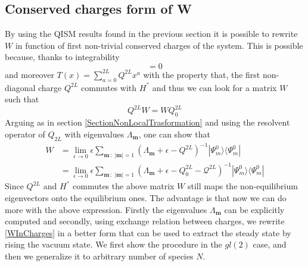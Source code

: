 \documentclass[10pt]{article}
\numberwithin{equation}{section}
\numberwithin{equation}{subsection}
\begin{document}
\subsection{Conserved charges form of W}
By using the QISM results found in the previous section it is possible to rewrite $W$ in function of first non-trivial conserved charges of the system. This is possible because, thanks to integrability
\begin{equation}
	[H^{''},T(x)]=0
\end{equation}
and moreover $T(x)=\sum_{a=0}^{2L}Q^{2L}x^{a}$ with the property that, the first non-diagonal charge $Q^{2L}$ commutes with $H^{''}$ and thus we can look for a matrix $W$ such that 
\begin{equation}
	Q^{2L}W=WQ_{0}^{2L}
\end{equation}
Arguing as in section \ref{SectionNonLocalTrasformation} and using the resolvent operator of $Q_{2L}$ with eigenvalues $\Lambda_{\bm{m}}$, one can show that 
\begin{equation}\label{WInCharges}
	\begin{split}
	W&=\lim_{\epsilon\to 0}\epsilon\sum_{\bm{m}\,:\;|\bm{m}|=1}\left(\Lambda_{\bm{m}}+\epsilon-Q^{2L}\right)^{-1}|\Psi_{m}^{0}\rangle\langle \Psi_{m}^{0}|\\&=\lim_{\epsilon\to 0}\epsilon\sum_{\bm{m}\,:\;|\bm{m}|=1}\left(\Lambda_{\bm{m}}+\epsilon-Q^{2L}_{0}-\mathcal{Q}^{2L}\right)^{-1}|\Psi_{m}^{0}\rangle\langle \Psi_{m}^{0}|
\end{split}
\end{equation}
Since $Q^{2L}$ and $H^{''}$ commutes the above matrix $W$ still maps the non-equilibrium eigenvectors onto the equilibrium ones. The advantage is that now we can do more with the above expression. Firstly the eigenvalues $\Lambda_{\bm{m}}$ can be explicitly computed and secondly, using exchange relation between charges, we rewrite \eqref{WInCharges} in a better form that can be used to extract the steady state by rising the vacuum state. We first show the procedure in the $gl(2)$ case, and then we generalize it to arbitrary number of species $N$. 
\end{document}
